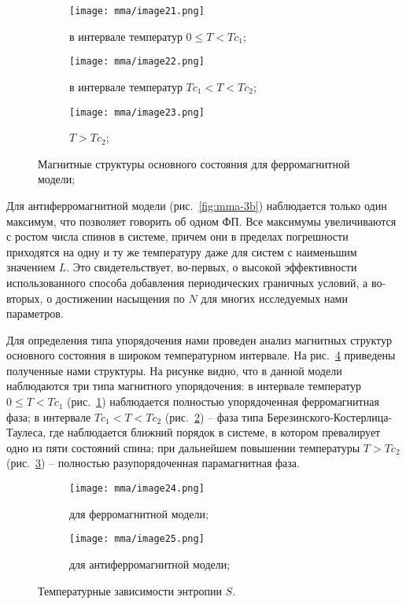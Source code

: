 \begin{figure}[ht]
    \begin{subfigure}{0.33\textwidth}
        \texttt{[image: mma/image21.png]}
        \caption{в интервале температур $0 \leq T < Tc_1$;}
        \label{fig:mma-4a}
    \end{subfigure}
    \begin{subfigure}{0.33\textwidth}
        \texttt{[image: mma/image22.png]}
        \caption{в интервале температур $Tc_1 < T < Tc_2$;}
        \label{fig:mma-4b}
    \end{subfigure}
    \begin{subfigure}{0.33\textwidth}
        \texttt{[image: mma/image23.png]}
        \caption{$T > Tc_2$;}
        \label{fig:mma-4c}
    \end{subfigure}
    \caption{Магнитные структуры основного состояния для ферромагнитной модели;}
    \label{fig:mma-4}
\end{figure}

Для антиферромагнитной модели (рис.~\ref{fig:mma-3b}) наблюдается только один максимум, что позволяет говорить об одном ФП. Все максимумы увеличиваются с ростом числа спинов в системе, причем они в пределах погрешности приходятся на одну и ту же температуру даже для систем с наименьшим значением $L$. Это свидетельствует, во-первых, о высокой эффективности использованного способа добавления периодических граничных условий, а во-вторых, о достижении насыщения по $N$ для многих исследуемых нами параметров.

Для определения типа упорядочения нами проведен анализ магнитных структур основного состояния в широком температурном интервале. На рис.~\ref{fig:mma-4} приведены полученные нами структуры. На рисунке видно, что в данной модели наблюдаются три типа магнитного упорядочения: в интервале температур $0 \leq T < Tc_1$ (рис.~\ref{fig:mma-4a}) наблюдается полностью упорядоченная ферромагнитная фаза; в интервале $Tc_1 < T < Tc_2$ (рис.~\ref{fig:mma-4b}) -- фаза типа Березинского-Костерлица-Таулеса, где наблюдается ближний порядок в системе, в котором превалирует одно из пяти состояний спина; при дальнейшем повышении температуры $T > Tc_2$ (рис.~\ref{fig:mma-4c}) -- полностью разупорядоченная парамагнитная фаза.

\begin{figure}[ht]
    \begin{subfigure}{0.5\textwidth}
        \texttt{[image: mma/image24.png]}
        \caption{для ферромагнитной модели;}
    \end{subfigure}
    \begin{subfigure}{0.5\textwidth}
        \texttt{[image: mma/image25.png]}
        \caption{для антиферромагнитной модели;}
    \end{subfigure}
    \caption{Температурные зависимости энтропии $S$.}
    \label{fig:mma-5}
\end{figure}

